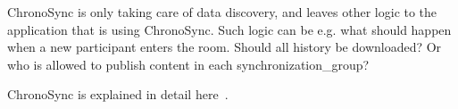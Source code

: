 ChronoSync is only taking care of \gls{data} discovery, and leaves other logic to the application that is using ChronoSync. 
Such logic can be e.g. what should happen when a new participant enters the room.
Should all history be downloaded? 
Or who is allowed to publish content in each \gls{synchronization_group}?

ChronoSync is explained in detail here~\cite{DBLP:conf/icnp/ZhuA13}.